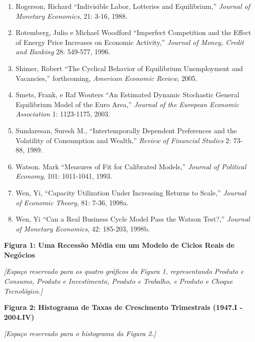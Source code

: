 \documentclass[12pt]{article}
\begin{document}
\begin{enumerate}
    \item Rogerson, Richard “Indivisible Labor, Lotteries and Equilibrium,” \textit{Journal of Monetary Economics}, 21: 3-16, 1988.
    \item Rotemberg, Julio e Michael Woodford “Imperfect Competition and the Effect of Energy Price Increases on Economic Activity,” \textit{Journal of Money, Credit and Banking} 28: 549-577, 1996.
    \item Shimer, Robert “The Cyclical Behavior of Equilibrium Unemployment and Vacancies,” forthcoming, \textit{American Economic Review}, 2005.
    \item Smets, Frank, e Raf Wouters “An Estimated Dynamic Stochastic General Equilibrium Model of the Euro Area,” \textit{Journal of the European Economic Association} 1: 1123-1175, 2003.
    \item Sundaresan, Suresh M., “Intertemporally Dependent Preferences and the Volatility of Consumption and Wealth,” \textit{Review of Financial Studies} 2: 73- 88, 1989.
    \item Watson. Mark “Measures of Fit for Calibrated Models,” \textit{Journal of Political Economy}, 101: 1011-1041, 1993.
    \item Wen, Yi, “Capacity Utilization Under Increasing Returns to Scale,” \textit{Journal of Economic Theory}, 81: 7-36, 1998a.
    \item Wen, Yi “Can a Real Business Cycle Model Pass the Watson Test?,” \textit{Journal of Monetary Economics}, 42: 185-203, 1998b.
\end{enumerate}

\newpage

\begin{center}
\textbf{Figura 1: Uma Recessão Média em um Modelo de Ciclos Reais de Negócios}
\end{center}

\textit{[Espaço reservado para os quatro gráficos da Figura 1, representando Produto e Consumo, Produto e Investimento, Produto e Trabalho, e Produto e Choque Tecnológico.]}

\vspace{1cm}

\begin{center}
\textbf{Figura 2: Histograma de Taxas de Crescimento Trimestrais (1947.I - 2004.IV)}
\end{center}

\textit{[Espaço reservado para o histograma da Figura 2.]}

\vspace{1cm}
\end{document}
